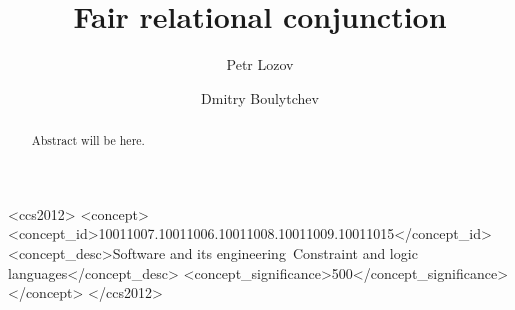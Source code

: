 \documentclass[acmlarge]{acmart}
\begin{document}
\title{Fair relational conjunction}

\author{Petr Lozov}

\author{Dmitry Boulytchev}



\begin{abstract}
  Abstract will be here.
\end{abstract}

\begin{CCSXML}
<ccs2012>
<concept>
<concept_id>10011007.10011006.10011008.10011009.10011015</concept_id>
<concept_desc>Software and its engineering~Constraint and logic languages</concept_desc>
<concept_significance>500</concept_significance>
</concept>
</ccs2012>
\end{CCSXML}



\maketitle











\end{document}
